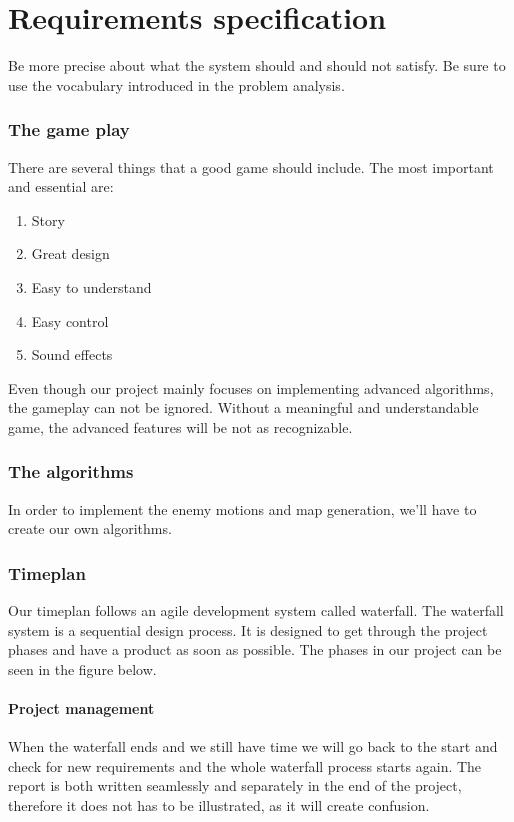 \chapter{Requirements specification}

Be more precise about what the system should and should not satisfy.
Be sure to use the vocabulary introduced in the problem analysis.

\subsection{The game play}%
There are several things that a good game should include. The most important
and essential are:

\begin{enumerate}
\item Story
\item Great design
\item Easy to understand
\item Easy control
\item Sound effects
\end{enumerate}

Even though our project mainly focuses on implementing advanced algorithms, the gameplay
can not be ignored. Without a meaningful and understandable game, the advanced features will
be not as recognizable.

\subsection{The algorithms}
In order to implement the enemy motions and map generation, we'll have to create our
own algorithms.



\subsection{Timeplan}%
Our timeplan follows an agile development system called waterfall.
The waterfall system is a sequential design process.
It is designed to get through the project phases and have a product as soon as
possible. The phases in our project can be seen in the figure below.

\subsubsection{Project management}
When the waterfall ends and we still have time
we will go back to the start and check for new requirements
and the whole waterfall process starts again.
The report is both written seamlessly and separately in the end of the project,
therefore it does not has to be illustrated, as it will create confusion.


